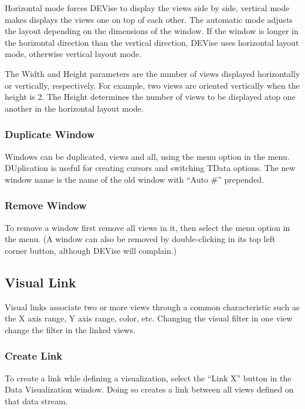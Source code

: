 Horizontal mode forces DEVise to display the views side by side, vertical mode
makes displays the views one on top of each other. The automatic mode adjusts
the layout depending on the dimensions of the window. If the window is longer in
the horizontal direction than the vertical direction, DEVise uses
horizontal layout mode, otherwise vertical layout mode.

The Width and Height parameters are the number of views displayed horizontally
or vertically, respectively. For example, two views are oriented vertically when
the height is 2. The Height determines the number of views to be displayed atop
one another in the horizontal layout mode.

\subsubsection{Duplicate Window}

Windows can be duplicated, views and all, using the  menu option
in the  menu. DUplication is useful for creating cursors and
switching TData options. The new window name is the name of the old window with
``Auto \#'' prepended.

\subsubsection{Remove Window}

To remove a window first remove all views in it, then select the 
menu option in the  menu. (A window can also be removed by
double-clicking in its top left corner button, although DEVise will complain.)


\subsection{Visual Link}

Visual links associate two or more views through a common characteristic such as
the X axis range, Y axis range, color, etc. Changing the visual filter in one
view change the filter in the linked views.

\subsubsection{Create Link}

To create a link whle defining a visualization, select the ``Link X'' button in
the Data Visualization window. Doing so creates a link between all views defined
on that data stream.

